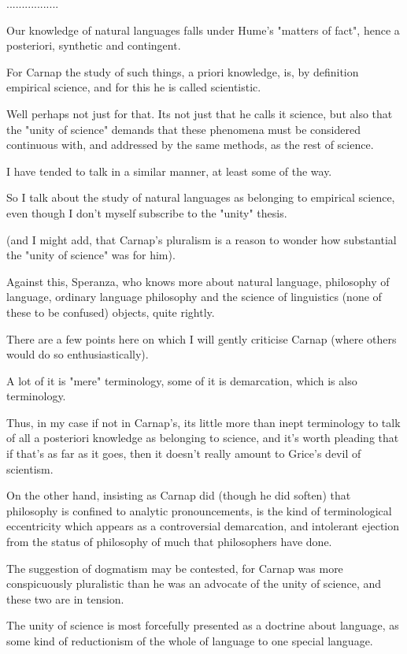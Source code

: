 \documentclass[10pt,titlepage]{book}
\begin{document}
.................

Our knowledge of natural languages falls under Hume's "matters of fact", hence a posteriori, synthetic and contingent.

For Carnap the study of such things, a priori knowledge, is, by definition empirical science, and for this he is called scientistic.

Well perhaps not just for that.  Its not just that he calls it science, but also that the "unity of science" demands that these phenomena must be considered continuous with, and addressed by the same methods, as the rest of science.

I have tended to talk in a similar manner, at least some of the way.

So I talk about the study of natural languages as belonging to empirical science, even though I don't myself subscribe to the "unity" thesis.

(and I might add, that Carnap's pluralism is a reason to wonder how substantial the "unity of science" was for him).

Against this, Speranza, who knows more about natural language, philosophy of language, ordinary language philosophy and the science of linguistics (none of these to be confused) objects, quite rightly.

There are a few points here on which I will gently criticise Carnap (where others would do so enthusiastically).

A lot of it is "mere" terminology, some of it is demarcation, which is also terminology.

Thus, in my case if not in Carnap's, its little more than inept terminology to talk of all a posteriori knowledge as belonging to science, and it's worth pleading that if that's as far as it goes, then it doesn't really amount to Grice's devil of scientism.

On the other hand, insisting as Carnap did (though he did soften) that philosophy is confined to analytic pronouncements, is the kind of terminological eccentricity which appears as a controversial demarcation, and intolerant ejection from the status of philosophy of much that philosophers have done.

The suggestion of dogmatism may be contested, for Carnap was more conspicuously pluralistic than he was an advocate of the unity of science, and these two are in tension.

The unity of science is most forcefully presented as a doctrine about language, as some kind of reductionism of the whole of language to one special language.
\end{document}
